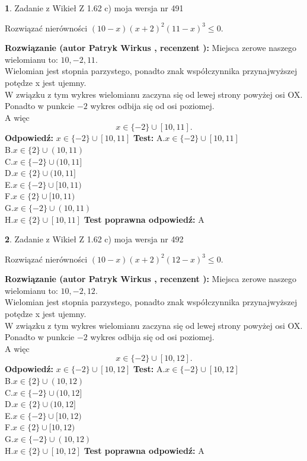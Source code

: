 \documentclass[12pt, a4paper]{article}
\theoremstyle{definition} %
\newtheorem{zad}{}
\newcommand{\zadStart}[1]{\begin{zad}#1\newline}
\newcommand{\zadStop}{\end{zad}}
\newcommand{\rozwStart}[2]{\noindent \textbf{Rozwiązanie (autor #1 , recenzent #2): }\newline}
\newcommand{\rozwStop}{\newline}
\newcommand{\odpStart}{\noindent \textbf{Odpowiedź:}\newline}
\newcommand{\odpStop}{\newline}
\newcommand{\testStart}{\noindent \textbf{Test:}\newline}
\newcommand{\testStop}{\newline}
\newcommand{\kluczStart}{\noindent \textbf{Test poprawna odpowiedź:}\newline}
\newcommand{\kluczStop}{\newline}
\begin{document}
\zadStart{Zadanie z Wikieł Z 1.62 c) moja wersja nr 491}

Rozwiązać nierówności $(10-x)(x+2)^{2}(11-x)^{3}\le0$.
\zadStop
\rozwStart{Patryk Wirkus}{}
Miejsca zerowe naszego wielomianu to: $10, -2, 11$.\\
Wielomian jest stopnia parzystego, ponadto znak współczynnika przy\linebreak najwyższej potędze x jest ujemny.\\ W związku z tym wykres wielomianu zaczyna się od lewej strony powyżej osi OX.\\
Ponadto w punkcie $-2$ wykres odbija się od osi poziomej.\\
A więc $$x \in \{-2\} \cup [10,11].$$
\rozwStop
\odpStart
$x \in \{-2\} \cup [10,11]$
\odpStop
\testStart
A.$x \in \{-2\} \cup [10,11]$\\
B.$x \in \{2\} \cup (10,11)$\\
C.$x \in \{-2\} \cup (10,11]$\\
D.$x \in \{2\} \cup (10,11]$\\
E.$x \in \{-2\} \cup [10,11)$\\
F.$x \in \{2\} \cup [10,11)$\\
G.$x \in \{-2\} \cup (10,11)$\\
H.$x \in \{2\} \cup [10,11]$
\testStop
\kluczStart
A
\kluczStop



\zadStart{Zadanie z Wikieł Z 1.62 c) moja wersja nr 492}

Rozwiązać nierówności $(10-x)(x+2)^{2}(12-x)^{3}\le0$.
\zadStop
\rozwStart{Patryk Wirkus}{}
Miejsca zerowe naszego wielomianu to: $10, -2, 12$.\\
Wielomian jest stopnia parzystego, ponadto znak współczynnika przy\linebreak najwyższej potędze x jest ujemny.\\ W związku z tym wykres wielomianu zaczyna się od lewej strony powyżej osi OX.\\
Ponadto w punkcie $-2$ wykres odbija się od osi poziomej.\\
A więc $$x \in \{-2\} \cup [10,12].$$
\rozwStop
\odpStart
$x \in \{-2\} \cup [10,12]$
\odpStop
\testStart
A.$x \in \{-2\} \cup [10,12]$\\
B.$x \in \{2\} \cup (10,12)$\\
C.$x \in \{-2\} \cup (10,12]$\\
D.$x \in \{2\} \cup (10,12]$\\
E.$x \in \{-2\} \cup [10,12)$\\
F.$x \in \{2\} \cup [10,12)$\\
G.$x \in \{-2\} \cup (10,12)$\\
H.$x \in \{2\} \cup [10,12]$
\testStop
\kluczStart
A
\kluczStop
\end{document}

